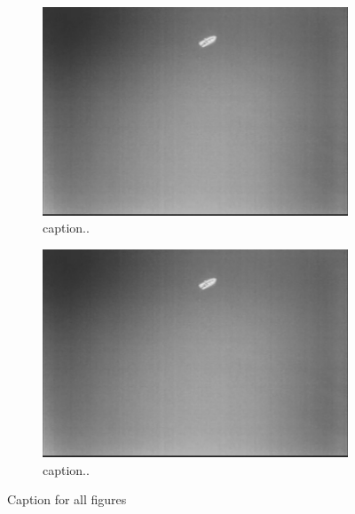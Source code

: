 \begin{figure}[ht]
\begin{subfigure}[b]{0.45\textwidth}
		\includegraphics[width=\textwidth]{fig1}
		\caption{caption..}
		\label{fig:2c}
	\end{subfigure}
	\begin{subfigure}[b]{0.45\textwidth}
		\includegraphics[width=\textwidth]{fig1}
		\caption{caption..}
		\label{fig:2d}
	\end{subfigure}
	\caption{Caption for all figures}\label{fig:2}
\end{figure}
